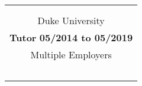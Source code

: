 \documentclass[11pt]{amsart}
\begin{document}
\begin{center}
\begin{tabular}{c}
\begin{minipage}{\textwidth}
		{\bf Teaching Assistant} \hfill {\bf 08/2016 to 12/2020}\\
		{Georgia Institute of Technology\\Duke University}\\
		
		{\bf Tutor} \hfill {\bf 05/2014 to 05/2019}\\
		Multiple Employers
	\end{minipage}\\~ \vspace*{-1em}\\


\end{tabular}
\end{center}
\end{document}
